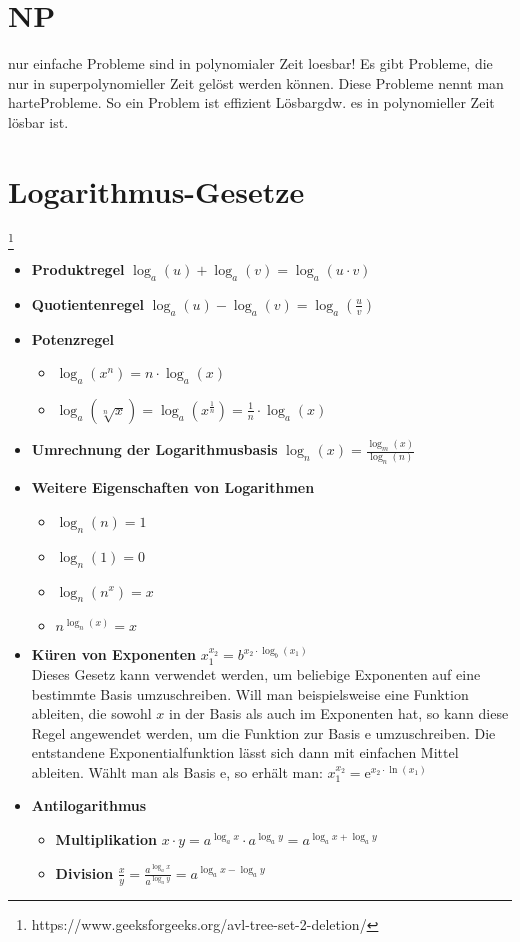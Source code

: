 \documentclass[jou,apacite]{apa6}
\begin{document}
\section{NP}
nur einfache Probleme sind in polynomialer Zeit loesbar! Es gibt Probleme, die nur in superpolynomieller Zeit gelöst werden können. Diese Probleme nennt man \dq harte\dq  Probleme. So ein Problem ist \dq effizient Lösbar\dq  gdw. es in polynomieller Zeit lösbar ist. 

\section{Logarithmus-Gesetze}\footnote{https://www.geeksforgeeks.org/avl-tree-set-2-deletion/}
\begin{itemize}
    \item{\bfseries Produktregel} $\log_{a}(u) + \log_{a}(v) = \log_{a}(u \cdot v)$
    \item{\bfseries Quotientenregel} $\log_{a}(u) - \log_{a}(v) = \log_{a}(\frac{u}{v})$
    \item{\bfseries Potenzregel}
    \begin{itemize}
        \item $\log_{a}(x^{n}) = n\cdot\log_{a}(x)$
        \item $\log_{a}(\sqrt[n]{x}) = \log_{a}(x^{\frac{1}{n}}) = \frac{1}{n}\cdot\log_{a}(x)$
    \end{itemize}
    \item{\bfseries Umrechnung der Logarithmusbasis} $\log_{n}(x) = \frac{\log_{m}(x)}{\log_{n}{(n)}}$
    \item{\bfseries Weitere Eigenschaften von Logarithmen}
    \begin{itemize}
        \item $\log_{n}(n) = 1$
        \item $\log_{n}(1) = 0$
        \item $\log_{n}(n^{x}) = x$
        \item $n^{\log_{n}(x)} = x$
    \end{itemize}
    \item{\bfseries Küren von Exponenten} $x_{1}^{x_{2}} = b^{x_{2}\cdot\log_{b}(x_{1})}$ \\
    Dieses Gesetz kann verwendet werden, um beliebige Exponenten auf eine bestimmte Basis umzuschreiben. Will man beispielsweise eine Funktion ableiten, die sowohl $x$ in der Basis als auch im Exponenten hat, so kann diese Regel angewendet werden, um die Funktion zur Basis $\mathrm{e}$ umzuschreiben. Die entstandene Exponentialfunktion lässt sich dann mit einfachen Mittel ableiten.
    Wählt man als Basis $\mathrm{e}$, so erhält man:
    $x_{1}^{x_{2}} = \mathrm{e}^{x_{2}\cdot\ln(x_{1})}$
    \item{\bfseries Antilogarithmus}
    \begin{itemize}
        \item{\bfseries Multiplikation} $x \cdot y = a^{\log_{a}x}\cdot a^{\log_{a}y} = a^{\log_{a}x + \log_{a}y}$
        \item{\bfseries Division} $\frac{x}{y} = \frac{a^{\log_{a}x}}{a^{\log_{a}y}} = a^{\log_{a}x-\log_{a}y}$
    \end{itemize}
\end{itemize}
\end{document}
